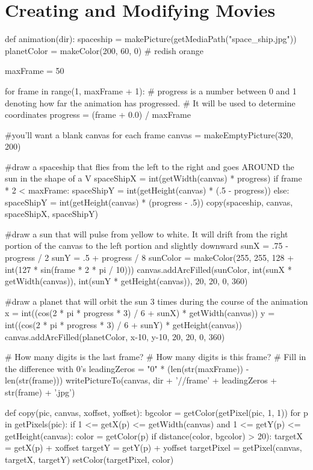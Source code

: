 \chapter{Creating and Modifying Movies}
\begin{exercises}

\begin{ex} %
\begin{example}
def animation(dir):
  spaceship = makePicture(getMediaPath("space\_ship.jpg"))
  planetColor = makeColor(200, 60, 0) # redish orange

  maxFrame = 50

  for frame in range(1, maxFrame + 1):
    # progress is a number between 0 and 1 denoting how far the animation
has progressed. 
    # It will be used to determine coordinates
    progress = (frame + 0.0) / maxFrame

    #you'll want a blank canvas for each frame
    canvas = makeEmptyPicture(320, 200)
		
    #draw a spaceship that flies from the left to the right and goes AROUND
the sun in the shape of a V
    spaceShipX = int(getWidth(canvas) * progress)
    if frame * 2 < maxFrame:
      spaceShipY = int(getHeight(canvas) * (.5 - progress))
    else:
      spaceShipY = int(getHeight(canvas) * (progress - .5))
    copy(spaceship, canvas, spaceShipX, spaceShipY)

    #draw a sun that will pulse from yellow to white. It will drift from
the right portion of the canvas to the left portion and slightly downward
    sunX = .75 - progress / 2
    sunY = .5 + progress / 8
    sunColor = makeColor(255, 255, 128 + int(127 * sin(frame * 2 * pi /
10)))
    canvas.addArcFilled(sunColor, int(sunX * getWidth(canvas)), int(sunY * getHeight(canvas)), 20, 20, 0, 360)

    #draw a planet that will orbit the sun 3 times during the course of the
animation
    x = int((cos(2 * pi * progress * 3) / 6 + sunX) * getWidth(canvas))
    y = int((cos(2 * pi * progress * 3) / 6 + sunY) * getHeight(canvas))
    canvas.addArcFilled(planetColor, x-10, y-10, 20, 20, 0, 360)

    # How many digits is the last frame?
    # How many digits is this frame?
    # Fill in the difference with 0's
    leadingZeros = "0" * (len(str(maxFrame)) - len(str(frame))) 
    writePictureTo(canvas, dir + '//frame' + leadingZeros + str(frame) + '.jpg') 

def copy(pic, canvas, xoffset, yoffset):
  bgcolor = getColor(getPixel(pic, 1, 1))
  for p in getPixels(pic):
    if 1 <= getX(p) <= getWidth(canvas) and 1 <= getY(p) <= getHeight(canvas):
      color = getColor(p)
      if distance(color, bgcolor) > 20):
        targetX = getX(p) + xoffset
        targetY = getY(p) + yoffset
        targetPixel = getPixel(canvas, targetX, targetY)
        setColor(targetPixel, color)
\end{example}
\end{ex}


\end{exercises}
